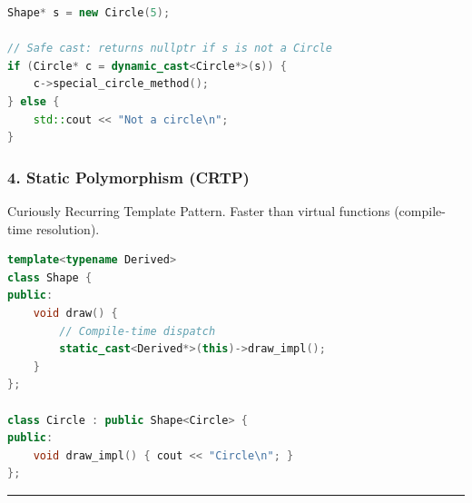 \begin{lstlisting}[language={C++}]
Shape* s = new Circle(5);

// Safe cast: returns nullptr if s is not a Circle
if (Circle* c = dynamic_cast<Circle*>(s)) {
    c->special_circle_method();
} else {
    std::cout << "Not a circle\n";
}
\end{lstlisting}

\hypertarget{static-polymorphism-crtp}{%
\subsubsection{4. Static Polymorphism
(CRTP)}\label{static-polymorphism-crtp}}

Curiously Recurring Template Pattern. Faster than virtual functions
(compile-time resolution).

\begin{lstlisting}[language={C++}]
template<typename Derived>
class Shape {
public:
    void draw() {
        // Compile-time dispatch
        static_cast<Derived*>(this)->draw_impl();
    }
};

class Circle : public Shape<Circle> {
public:
    void draw_impl() { cout << "Circle\n"; }
};
\end{lstlisting}

\begin{center}\rule{0.5\linewidth}{0.5pt}\end{center}
